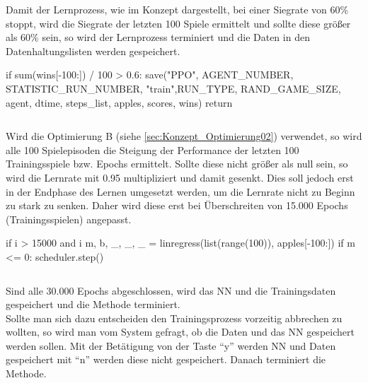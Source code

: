 Damit der Lernprozess, wie im Konzept dargestellt, bei einer Siegrate von 60\% stoppt, wird die Siegrate der letzten 100 Spiele ermittelt und sollte diese größer als 60\% sein, so wird der Lernprozess terminiert und die Daten in den Datenhaltungslisten werden gespeichert.
\begin{python}
if sum(wins[-100:]) / 100 > 0.6:
	save("PPO", AGENT_NUMBER, STATISTIC_RUN_NUMBER, "train",RUN_TYPE, RAND_GAME_SIZE, agent, dtime, steps_list, apples, scores, wins)
	return
\end{python}
\begin{lstlisting}[caption=Abbruchbedingung, label=code:Abbruchbedingung]
\end{lstlisting}
Wird die Optimierung B (siehe \ref{sec:Konzept_Optimierung02}) verwendet, so wird alle 100 Spielepisoden die Steigung der Performance der letzten 100 Trainingsspiele bzw. Epochs ermittelt. Sollte diese nicht größer als null sein, so wird die Lernrate mit 0.95 multipliziert und damit gesenkt. Dies soll jedoch erst in der Endphase des Lernen umgesetzt werden, um die Lernrate nicht zu Beginn zu stark zu senken. Daher wird diese erst bei Überschreiten von 15.000 Epochs (Trainingsspielen) angepasst.
\begin{python}
if i > 15000 and i %
	m, b, _, _, _ = linregress(list(range(100)), apples[-100:])
	if m <= 0:
		scheduler.step()
\end{python}
\begin{lstlisting}[caption=Anwendung von Optimierung B - Scheduler, label=code:Optimierung_B]
\end{lstlisting}
Sind alle 30.000 Epochs abgeschlossen, wird das NN und die Trainingsdaten gespeichert und die Methode terminiert.\\
Sollte man sich dazu entscheiden den Trainingsprozess vorzeitig abbrechen zu wollten, so wird man vom System gefragt, ob die Daten und das NN gespeichert werden sollen. Mit der Betätigung von der Taste "`y"' werden NN und Daten gespeichert mit "`n"' werden diese nicht gespeichert. Danach terminiert die Methode.

